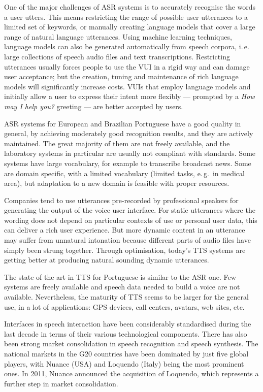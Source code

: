 \begin{multicols}{2}
One of the major challenges of ASR systems is to accurately recognise the words a user utters. This means restricting the range of possible user utterances to a limited set of keywords, or manually creating language models that cover a large range of natural language utterances. Using machine learning techniques, language models can also be generated automatically from speech corpora, i.\,e. large collections of speech audio files and text transcriptions. Restricting utterances usually forces people to use the VUI in a rigid way and can damage user acceptance; but the creation, tuning and maintenance of rich language models will significantly increase costs. VUIs that employ language models and initially allow a user to express their intent more flexibly — prompted by a \textit{How may I help you?} greeting —  are better accepted by users.

ASR systems for European and Brazilian Portuguese have a good quality in general, by achieving moderately good recognition results, and they are actively maintained. The great majority of them are not freely available, and the laboratory systems in particular are usually not compliant with standards. Some systems have large vocabulary, for example to transcribe broadcast news. Some are domain specific, with a limited vocabulary (limited tasks, e.\,g.~in medical area), but adaptation to a new domain is feasible with proper resources.

Companies tend to use utterances pre-recorded by professional speakers for generating the output of the voice user interface. For static utterances where the wording does not depend on particular contexts of use or personal user data, this can deliver a rich user experience. But more dynamic content in an utterance may suffer from unnatural intonation because different parts of audio files have simply been strung together. Through optimisation, today’s TTS systems are getting better at producing natural sounding dynamic utterances.

The state of the art in TTS for Portuguese is similar to the ASR one. Few systems are freely available and speech data needed to build a voice are not available. Nevertheless, the maturity of TTS seems to be larger for the general use, in a lot of applications: GPS devices, call centers, avatars, web sites, etc.

Interfaces in speech interaction have been considerably standardised during the last decade in terms of their various technological components. There has also been strong market consolidation in speech recognition and speech synthesis. The national markets in the G20 countries have been dominated by just five global players, with Nuance (USA) and Loquendo (Italy) being the most prominent ones. In 2011, Nuance announced the acquisition of Loquendo, which represents a further step in market consolidation.


\end{multicols}

